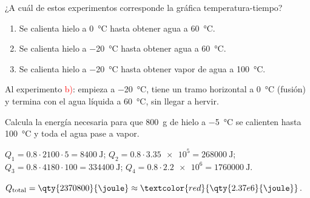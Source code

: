 \begin{exercise}
    ¿A cuál de estos experimentos corresponde la gráfica temperatura-tiempo?
    \begin{center}
    \end{center}
    \begin{enumerate}[label=\alph*)]
        \item Se calienta hielo a \qty{0}{\degreeCelsius} hasta obtener agua a \qty{60}{\degreeCelsius}.
        \item Se calienta hielo a \qty{-20}{\degreeCelsius} hasta obtener agua a \qty{60}{\degreeCelsius}.
        \item Se calienta hielo a \qty{-20}{\degreeCelsius} hasta obtener vapor de agua a \qty{100}{\degreeCelsius}.
    \end{enumerate}
    \begin{solu}
        Al experimento \textcolor{red}{b)}: empieza a \qty{-20}{\degreeCelsius}, tiene un tramo horizontal a \qty{0}{\degreeCelsius} (fusión) y termina con el agua líquida a \qty{60}{\degreeCelsius}, sin llegar a hervir.
    \end{solu}
\end{exercise}

\begin{exercise}
    Calcula la energía necesaria para que \qty{800}{\gram} de hielo a \qty{-5}{\degreeCelsius} se calienten hasta \qty{100}{\degreeCelsius} y toda el agua pase a vapor.
    \begin{solu}
        \(Q_1 = \num{0.8} \cdot 2100 \cdot 5 = \qty{8400}{\joule}\); \(Q_2 = \num{0.8} \cdot \num{3.35e5} = \qty{268000}{\joule}\); \(Q_3 = \num{0.8} \cdot 4180 \cdot 100 = \qty{334400}{\joule}\); \(Q_4 = \num{0.8} \cdot \num{2.2e6} = \qty{1760000}{\joule}\).

        \(Q_{\text{total}} = \qty{2370800}{\joule} \approx \textcolor{red}{\qty{2.37e6}{\joule}}\).
    \end{solu}
\end{exercise}

